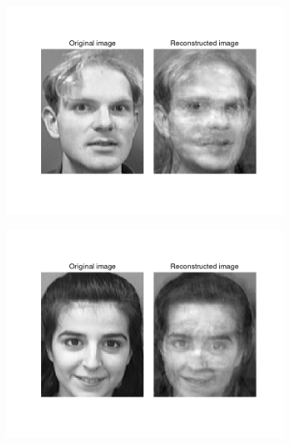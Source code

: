 \begin{homeworkProblem}
  \begin{figure}[H]
    \centering
    \begin{subfigure}{0.5\textwidth}
      \centering
      \includegraphics[width=1.\linewidth]{./images/encoded_1.png}
    \end{subfigure}%
    \begin{subfigure}{0.5\textwidth}
      \centering
      \includegraphics[width=1.\linewidth]{./images/encoded_2.png}
    \end{subfigure}
    \begin{subfigure}{0.5\textwidth}
      \centering

\end{subfigure}
\end{figure}
\end{homeworkProblem}
